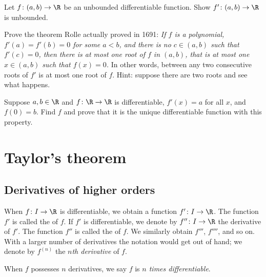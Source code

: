 \documentclass[12pt]{book}
\begin{document}
\begin{exercise}
Let $f \colon (a,b) \to \R$ be an unbounded differentiable function.
Show
$f' \colon (a,b) \to \R$ is unbounded.
\end{exercise}

\begin{exercise}
Prove the theorem Rolle actually proved in 1691:
\emph{If $f$ is a polynomial,
$f'(a) = f'(b) = 0$ for some $a < b$,
and there is no $c \in (a,b)$ such that $f'(c) = 0$,
then there is at most one root of $f$ in $(a,b)$,
that is at most one $x \in (a,b)$ such that $f(x) = 0$.}
In other words, between any two consecutive roots of $f'$ is at most one
root of $f$.
Hint: suppose there are two roots and see what happens.
\end{exercise}

\begin{exercise}
Suppose $a,b \in \R$ and $f \colon \R \to \R$ is differentiable,
$f'(x) = a$ for all $x$, and $f(0) = b$.
Find $f$ and prove that 
it is the unique differentiable function with this property.
\end{exercise}




\sectionnewpage
\section{Taylor's theorem}
\label{sec:taylor}


\subsection*{Derivatives of higher orders}

When $f \colon I \to \R$ is differentiable, we obtain a function
$f' \colon I \to \R$.
The function
$f'$ is called the \emph{} of $f$.
If $f'$ is differentiable, we denote by
$f'' \colon I \to \R$ the derivative of $f'$.
The function $f''$
is called the \emph{} of $f$.
We similarly obtain
$f'''$, $f''''$, and so on.
With a larger number of derivatives
the notation would get out of hand; we denote
by $f^{(n)}$ the \emph{$n$th derivative} of $f$.

When $f$ possesses $n$ derivatives, we say $f$ is
\emph{$n$ times differentiable}.
\end{document}
